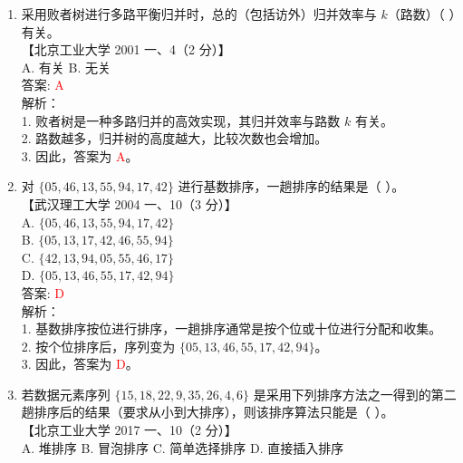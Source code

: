 \documentclass[lang=cn,newtx,10pt,scheme=chinese]{../../../elegantbook}
\begin{document}
\begin{enumerate}
\item 采用败者树进行多路平衡归并时，总的（包括访外）归并效率与 $k$（路数）（ ）有关。\\
    【北京工业大学 2001 一、4（2 分）】\\  

    A. 有关 \quad B. 无关 \\  

    答案: \textcolor{red}{A} \\

    解析：\\
    1. 败者树是一种多路归并的高效实现，其归并效率与路数 $k$ 有关。\\
    2. 路数越多，归并树的高度越大，比较次数也会增加。\\
    3. 因此，答案为 \textcolor{red}{A}。\\

    \item 对 $\{05, 46, 13, 55, 94, 17, 42\}$ 进行基数排序，一趟排序的结果是（ ）。\\
    【武汉理工大学 2004 一、10（3 分）】\\  

    A. $\{05, 46, 13, 55, 94, 17, 42\}$ \\  
    B. $\{05, 13, 17, 42, 46, 55, 94\}$ \\  
    C. $\{42, 13, 94, 05, 55, 46, 17\}$ \\  
    D. $\{05, 13, 46, 55, 17, 42, 94\}$ \\  

    答案: \textcolor{red}{D} \\

    解析：\\
    1. 基数排序按位进行排序，一趟排序通常是按个位或十位进行分配和收集。\\
    2. 按个位排序后，序列变为 $\{05, 13, 46, 55, 17, 42, 94\}$。\\
    3. 因此，答案为 \textcolor{red}{D}。\\

\item 若数据元素序列 $\{15, 18, 22, 9, 35, 26, 4, 6\}$ 是采用下列排序方法之一得到的第二趟排序后的结果（要求从小到大排序），则该排序算法只能是（ ）。\\
    【北京工业大学 2017 一、10（2 分）】\\  

    A. 堆排序 \quad B. 冒泡排序 \quad C. 简单选择排序 \quad D. 直接插入排序 \\  


\end{enumerate}
\end{document}
